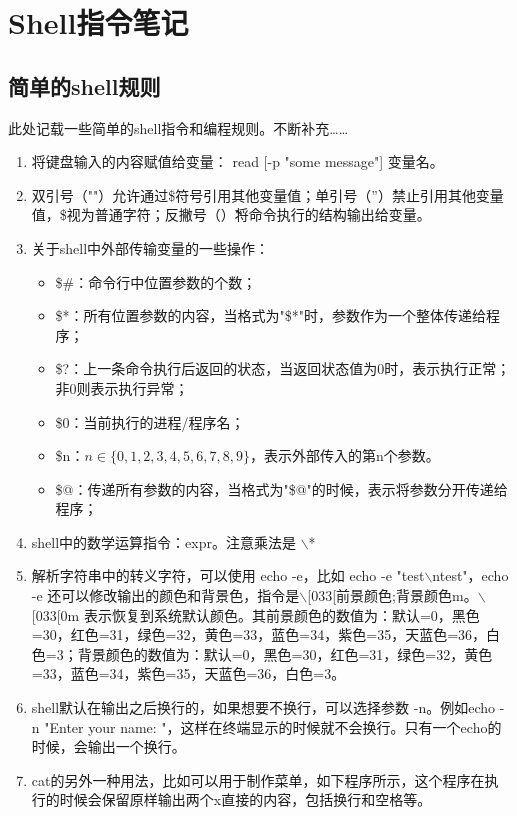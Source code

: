 \section{Shell指令笔记}

\subsection{简单的shell规则}
此处记载一些简单的shell指令和编程规则。不断补充……
\begin{enumerate}
  \item 将键盘输入的内容赋值给变量： read [-p "some message"] 变量名。
  \item 双引号（""）允许通过\$符号引用其他变量值；单引号（''）禁止引用其他变量值，\$视为普通字符；反撇号（\`\`）将命令执行的结构输出给变量。
  \item 关于shell中外部传输变量的一些操作：
    \begin{itemize}
      \item \$\#：命令行中位置参数的个数；
      \item \$*：所有位置参数的内容，当格式为"\$*"时，参数作为一个整体传递给程序；
      \item \$?：上一条命令执行后返回的状态，当返回状态值为0时，表示执行正常；非0则表示执行异常；
      \item \$0：当前执行的进程/程序名；
      \item \$n：$n\in\{0,1,2,3,4,5,6,7,8,9\}$，表示外部传入的第n个参数。
      \item \$@：传递所有参数的内容，当格式为"\$@"的时候，表示将参数分开传递给程序；
    \end{itemize}
  \item shell中的数学运算指令：expr。注意乘法是 $\backslash$*
  \item 解析字符串中的转义字符，可以使用 echo -e，比如 echo -e "test$\backslash$ntest"，echo -e 还可以修改输出的颜色和背景色，指令是$\backslash$[033[前景颜色;背景颜色m。$\backslash$[033[0m 表示恢复到系统默认颜色。其前景颜色的数值为：默认=0，黑色=30，红色=31，绿色=32，黄色=33，蓝色=34，紫色=35，天蓝色=36，白色=3；背景颜色的数值为：默认=0，黑色=30，红色=31，绿色=32，黄色=33，蓝色=34，紫色=35，天蓝色=36，白色=3。
  \item shell默认在输出之后换行的，如果想要不换行，可以选择参数 -n。例如echo -n "Enter your name: "，这样在终端显示的时候就不会换行。只有一个echo的时候，会输出一个换行。
  \item cat的另外一种用法，比如可以用于制作菜单，如下程序所示，这个程序在执行的时候会保留原样输出两个x直接的内容，包括换行和空格等。

\end{enumerate}
